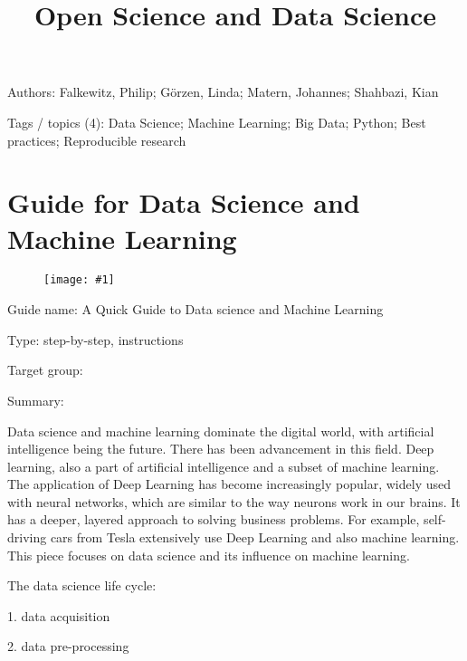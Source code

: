 \documentclass{article}
\newlength{\imgwidth}
\newcommand\scaledgraphics[2]{%
                
\settowidth{\imgwidth}{\texttt{[image: \#1]}}%
                
\setlength{\imgwidth}{\minof{\imgwidth}{#2\textwidth}}%
                
\texttt{[image: \#1]}%
                
}
\begin{document}
\title{Open Science and Data Science}

\maketitle


Authors: Falkewitz, Philip;  Görzen, Linda; Matern, Johannes;  Shahbazi, Kian 


Tags / topics (4): Data Science; Machine Learning; Big Data; Python; Best practices; Reproducible research





\section{Guide for Data Science and Machine Learning}\label{H2305886}






\begin{center}
\begin{figure}
\scaledgraphics{a6637b1c-427c-4ae5-a756-e31455d2fc96.png}{0.5}
\label{F25480991}
\end{figure}


\end{center}


 


Guide name: A Quick Guide to Data science and Machine Learning \autocite{qureshi_quick_2020}


Type: step-by-step, instructions


Target group:


Summary: 


Data science and machine learning dominate the digital world, with artificial intelligence being the future. There has been advancement in this field. Deep learning, also a part of artificial intelligence and a subset of machine learning. The application of Deep Learning has become increasingly popular, widely used with neural networks, which are similar to the way neurons work in our brains. It has a deeper, layered approach to solving business problems. For example, self-driving cars from Tesla extensively use Deep Learning and also machine learning. This piece focuses on data science and its influence on machine learning.


The data science life cycle:


1. data acquisition


2. data pre-processing
\end{document}
